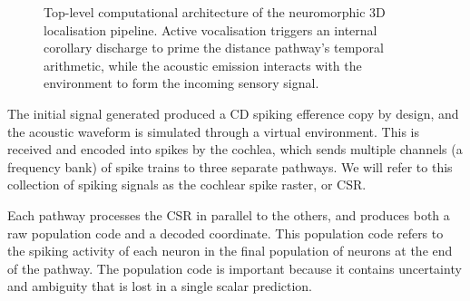 \begin{figure}[htbp]
\begin{subfigure}{\textwidth}
    \end{subfigure}
    \caption{Top-level computational architecture of the neuromorphic 3D localisation pipeline. Active vocalisation triggers an internal corollary discharge to prime the distance pathway's temporal arithmetic, while the acoustic emission interacts with the environment to form the incoming sensory signal.}
    \label{fig:top_level_system_block}
\end{figure}

The initial signal generated produced a CD spiking efference copy by design, and the acoustic waveform is simulated through a virtual environment. This is received and encoded into spikes by the cochlea, which sends multiple channels (a frequency bank) of spike trains to three separate pathways. We will refer to this collection of spiking signals as the cochlear spike raster, or CSR.

Each pathway processes the CSR in parallel to the others, and produces both a raw population code and a decoded coordinate. This population code refers to the spiking activity of each neuron in the final population of neurons at the end of the pathway. The population code is important because it contains uncertainty and ambiguity that is lost in a single scalar prediction. 

